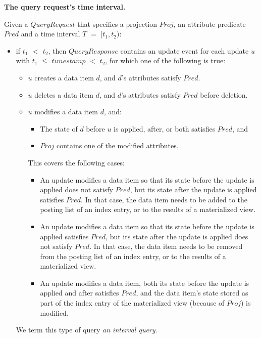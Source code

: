 \medskip
\noindent
\textbf{The query request's time interval.}

\noindent
Given a $QueryRequest$ that specifies a projection $Proj$,
an attribute predicate $Pred$
and a time interval $T$ $=$ $[t_1, t_2)$:
\begin{itemize}

  \item if \textbf{$t_1$ $<$ $t_2$},
  then $QueryResponse$ contains an update event for each update $u$ with $t_1$ $\leq$ $timestamp$ $<$ $t_2$,
  for which one of the following is true:
  \begin{itemize}
    \item $u$ creates a data item $d$, and $d$'s attributes satisfy $Pred$.

    \item $u$ deletes a data item $d$, and $d$'s attributes satisfy $Pred$ before deletion.

    \item $u$ modifies a data item $d$, and:
    \begin{itemize}
      \item The state of $d$ before $u$ is applied, after, or both satisfies $Pred$, and
      \item $Proj$ contains one of the modified attributes.
    \end{itemize}

    This covers the following cases:
    \begin{itemize}
      \item An update modifies a data item so that its state before the update is applied does not satisfy $Pred$,
      but its state after the update is applied satisfies $Pred$.
      In that case, the data item needs to be added to the posting list of an index entry, or to the results of a
      materialized view.

      \item An update modifies a data item so that its state before the update is applied satisfies $Pred$,
      but its state after the update is applied does not satisfy $Pred$.
      In that case, the data item needs to be removed from the posting list of an index entry, or to the results of a
      materialized view.

      \item An update modifies a data item, both its state before the update is applied and after satisfies $Pred$,
      and the data item's state stored as part of the index entry of the materialized view (because of $Proj$) is modified.
    \end{itemize}
  \end{itemize}
  We term this type of query \textit{an interval query}.


\end{itemize}
